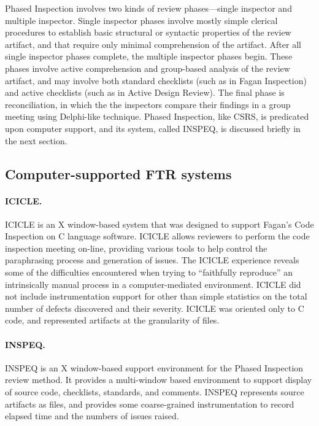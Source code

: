 Phased Inspection \cite{Knight93} involves two kinds of review
phases---single inspector and multiple inspector.  Single inspector phases
involve mostly simple clerical procedures to establish basic structural or
syntactic properties of the review artifact, and that require only minimal
comprehension of the artifact.  After all single inspector phases complete,
the multiple inspector phases begin.  These phases involve active
comprehension and group-based analysis of the review artifact, and may
involve both standard checklists (such as in Fagan Inspection) and active
checklists (such as in Active Design Review).  The final phase is
reconciliation, in which the the inspectors compare their findings in a
group meeting using Delphi-like technique.  Phased Inspection, like CSRS,
is predicated upon computer support, and its system, called INSPEQ, is
discussed briefly in the next section.


\subsection{Computer-supported FTR systems}
\label{sidebar:ftr-systems}


\paragraph{ICICLE.}

ICICLE \cite{Brothers90} is an X window-based system that was designed to
support Fagan's Code Inspection on C language software.  ICICLE allows
reviewers to perform the code inspection meeting on-line, providing various
tools to help control the paraphrasing process and generation of issues.
The ICICLE experience reveals some of the difficulties encountered when
trying to ``faithfully reproduce'' an intrinsically manual process in a
computer-mediated environment.  ICICLE did not include instrumentation
support for other than simple statistics on the total number of defects
discovered and their severity.  ICICLE was oriented only to C code, and
represented artifacts at the granularity of files.

\paragraph {INSPEQ.}

INSPEQ \cite{Knight93} is an X window-based support environment for the
Phased Inspection review method.  It provides a multi-window based
environment to support display of source code, checklists, standards, and
comments.  INSPEQ represents source artifacts as files, and provides some
coarse-grained instrumentation to record elapsed time and the numbers of
issues raised.

